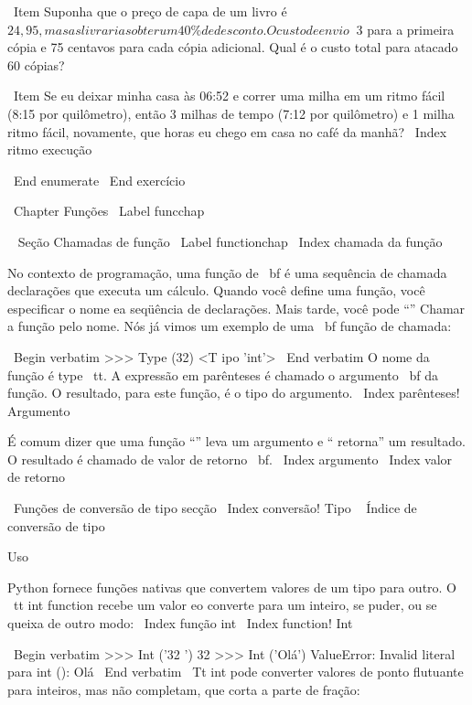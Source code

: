 \documentclass[10pt]{book}
\begin{document}
\begin {itemize}
{\ Item Suponha que o preço de capa de um livro é \ $ 24,95, mas as livrarias obter um
  40 \% de desconto. O custo de envio \ $ 3 para a primeira cópia e 75 centavos
  para cada cópia adicional. Qual é o custo total para atacado
  60 cópias?

\ Item Se eu deixar minha casa às 06:52 e correr uma milha em um ritmo fácil
  (8:15 por quilômetro), então 3 milhas de tempo (7:12 por quilômetro) e 1 milha
  ritmo fácil, novamente, que horas eu chego em casa no café da manhã?
\ Index {ritmo execução}

\ End {enumerate}
\ End {} exercício


\ Chapter {Funções}
\ Label {} funcchap

\ {} Seção Chamadas de função
\ Label {} functionchap
\ Index {chamada da função}

No contexto de programação, uma função de {\ bf} é uma sequência de chamada
declarações que executa um cálculo. Quando você define uma função,
você especificar o nome ea seqüência de declarações. Mais tarde, você pode
``'' Chamar a função pelo nome.  
Nós já vimos um exemplo de uma {\ bf função de chamada}:

\ Begin {verbatim}
>>> Type (32)
<T ipo 'int'>
\ End {verbatim}
%
O nome da função é {type \ tt}. A expressão em parênteses
é chamado o argumento {\ bf} da função. O resultado, para este
função, é o tipo do argumento.
\ Index {parênteses! Argumento}

É comum dizer que uma função ``'' leva um argumento e `` retorna''
um resultado. O resultado é chamado de valor de retorno {\ bf}.
\ Index {argumento}
\ Index {valor de retorno}


\ {Funções de conversão de tipo} secção
\ Index {conversão! Tipo}
\ {} Índice de conversão de tipo

Uso%


Python fornece funções nativas que convertem valores
de um tipo para outro. O {\ tt int} function recebe um valor eo
converte para um inteiro, se puder, ou se queixa de outro modo:
\ Index {função int}
\ Index {function! Int}

\ Begin {verbatim}
>>> Int ('32 ')
32
>>> Int ('Olá')
ValueError: Invalid literal para int (): Olá
\ End {verbatim}
%
{\ Tt int} pode converter valores de ponto flutuante para inteiros, mas
não completam, que corta a parte de fração:

}
\end{itemize}
\end{document}
